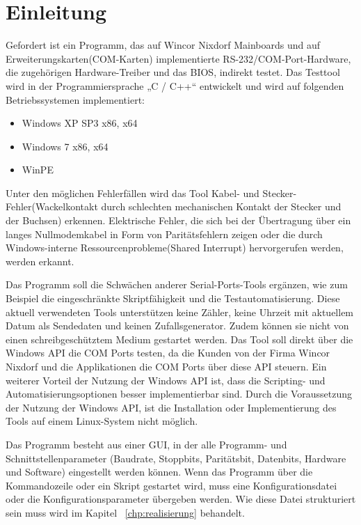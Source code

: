 \chapter{Einleitung}\label{chp:einleitung}
Gefordert ist ein Programm, das auf Wincor Nixdorf Mainboards und auf Erweiterungskarten(COM-Karten) implementierte RS-232/COM-Port-Hardware, die zugehörigen Hardware-Treiber und das BIOS, indirekt testet. Das Testtool wird in der Programmiersprache „C / C++“ entwickelt und wird auf folgenden Betriebssystemen implementiert:

\begin{itemize}
\item Windows XP SP3 x86, x64
\item Windows 7 x86, x64
\item  WinPE
\end{itemize}

Unter den möglichen Fehlerfällen wird das Tool Kabel- und Stecker-Fehler(Wackelkontakt durch schlechten mechanischen Kontakt der Stecker und der Buchsen) erkennen.
Elektrische Fehler, die sich bei der Übertragung über ein langes Nullmodemkabel in Form von Paritätsfehlern zeigen oder die durch Windows-interne Ressourcenprobleme(Shared Interrupt) hervorgerufen werden, werden erkannt.

Das Programm soll die Schwächen anderer Serial-Ports-Tools ergänzen, wie zum Beispiel die eingeschränkte Skriptfähigkeit und die Testautomatisierung. Diese aktuell verwendeten Tools unterstützen keine Zähler, keine Uhrzeit mit aktuellem Datum als Sendedaten und keinen Zufallsgenerator. Zudem können sie nicht von einen schreibgeschütztem Medium gestartet werden. Das Tool soll direkt über die Windows API die COM Ports testen, da die Kunden von der Firma Wincor Nixdorf und die Applikationen die COM Ports über diese API steuern. Ein weiterer Vorteil der Nutzung der Windows API ist, dass die Scripting- und Automatisierungsoptionen besser implementierbar sind. Durch die Voraussetzung der Nutzung der Windows API, ist die Installation oder Implementierung des Tools auf einem Linux-System nicht möglich.

Das Programm besteht aus einer GUI, in der alle Programm- und Schnittstellenparameter (Baudrate, Stoppbits, Paritätsbit, Datenbits, Hardware und Software) eingestellt werden können. Wenn das Programm über die Kommandozeile oder ein Skript gestartet wird, muss eine Konfigurationsdatei oder die Konfigurationsparameter übergeben werden. Wie diese Datei strukturiert sein muss wird im Kapitel ~\ref{chp:realisierung} behandelt.